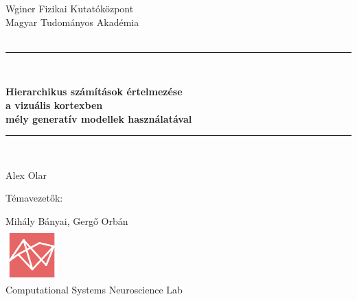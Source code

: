 \documentclass[12pt, english]{article}
\makeatletter
\newcounter{unomenos}
\gdef\@date{ \arabic{unomenos} }
\makeatother
\begin{document}
\begin{titlepage}

\begin{center}
Wginer Fizikai Kutatóközpont \\ Magyar Tudományos Akadémia \\ \@date\\
\vspace*{0.5in}
\rule{150mm}{0.1mm}\\
\vspace*{0.3in}
\begin{Large}
\textbf{Hierarchikus számítások értelmezése \\ a vizuális kortexben\\ mély generatív modellek használatával} \\
\end{Large}
\vspace*{0.3in}
\rule{150mm}{0.1mm}\\
\vspace*{0.4in}
\begin{large}
Alex Olar \\
\end{large}
\vfill
\begin{small}
Témavezetők: \\
\end{small}
\vspace{1mm}
Mihály Bányai, Gergő Orbán \\
\vspace{4mm}
\includegraphics[width=2cm]{logoFAC.png}
\vspace{2mm}
\\ Computational Systems Neuroscience Lab
\end{center}
\end{titlepage}

\newcommand{\CC}{C\nolinebreak\hspace{-.05em}\raisebox{.4ex}{\tiny\bf +}\nolinebreak\hspace{-.10em}\raisebox{.4ex}{\tiny\bf +}}
\def\CC{{C\nolinebreak[4]\hspace{-.05em}\raisebox{.4ex}{\tiny\bf ++}}}

\renewcommand{\thesection}{\Roman{section}}
\renewcommand{\thesubsection}{\Roman{section}. \arabic{subsection}}
\renewcommand{\thesubsubsection}{\Roman{section}. \arabic{subsection}.\arabic{subsection}}
\end{document}
